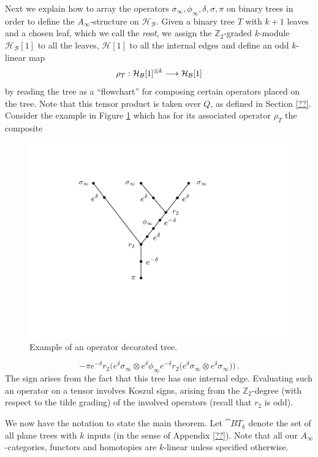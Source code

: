 \documentclass[english,letter paper,12pt,leqno]{article}
\theoremstyle{example}
\numberwithin{equation}{section}
\def\BB{\mathcal{B}}
\def\HH{\HH}
\def\HH{\mathcal{H}}
\def\be{\begin{equation}}
\def\ee{\end{equation}}
\def\nZ{\mathds{Z}}
\begin{document}
Next we explain how to array the operators $\sigma_\infty, \phi_\infty, \delta, \sigma, \pi$ on binary trees in order to define the $A_\infty$-structure on $\HH_{\BB}$. Given a binary tree $T$ with $k+1$ leaves and a chosen leaf, which we call the \emph{root}, we assign the $\nZ_2$-graded $k$-module $\HH_{\BB}[1]$ to all the leaves, $\HH[1]$ to all the internal edges and define an odd $k$-linear map
\[
\rho_T: \HH_{\BB}[1]^{\otimes k} \lto \HH_{\BB}[1]
\]
by reading the tree as a ``flowchart'' for composing certain operators placed on the tree. Note that this tensor product is taken over $Q$, as defined in Section \ref{??}. Consider the example in Figure \ref{fig:opdectree} which has for its associated operator $\rho_T$ the composite
\begin{figure}
\begin{center}
\includegraphics[scale=0.35]{dia13}
\end{center}
\centering
\caption{Example of an operator decorated tree.}\label{fig:opdectree}
\end{figure}
\be\label{eq:explicit_tree_operator}
- \pi e^{-\delta} r_2\Big( e^{\delta}\sigma_\infty \otimes e^{\delta} \phi_\infty e^{-\delta} r_2\Big( e^{\delta} \sigma_\infty \otimes e^{\delta} \sigma_\infty \Big) \Big)\,.
\ee
The sign arises from the fact that this tree has one internal edge. Evaluating such an operator on a tensor involves Koszul signs, arising from the $\nZ_2$-degree (with respect to the tilde grading) of the involved operators (recall that $r_2$ is odd).

We now have the notation to state the main theorem. Let $\cat{BT}_k$ denote the set of all plane trees with $k$ inputs (in the sense of Appendix \ref{??}). Note that all our $A_\infty$-categories, functors and homotopies are $k$-linear unless specified otherwise.
\end{document}
